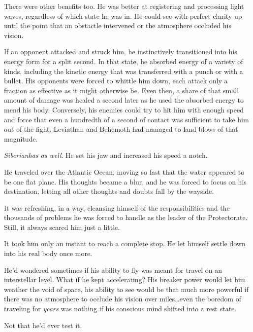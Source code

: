 There were other benefits too.  He was better at registering and processing light waves, regardless of which state he was in.  He could see with perfect clarity up until the point that an obstactle intervened or the atmosphere occluded his vision.



If an opponent attacked and struck him, he instinctively transitioned into his energy form for a split second.  In that state, he absorbed energy of a variety of kinds, including the kinetic energy that was transferred with a punch or with a bullet.  His opponents were forced to whittle him down, each attack only a fraction as effective as it might otherwise be.  Even then, a share of that small amount of damage was healed a second later as he used the absorbed energy to mend his body.  Conversely, his enemies could try to hit him with enough speed and force that even a hundredth of a second of contact was sufficient to take him out of the fight.  Leviathan and Behemoth had managed to land blows of that magnitude.



\emph{Siberian}\emph{has as well}.  He set his jaw and increased his speed a notch.



He traveled over the Atlantic Ocean, moving so fast that the water appeared to be one flat plane.  His thoughts became a blur, and he was forced to focus on his destination, letting all other thoughts and doubts fall by the wayside.



It was refreshing, in a way, cleansing himself of the responsibilities and the thousands of problems he was forced to handle as the leader of the Protectorate.  Still, it always scared him just a little.



It took him only an instant to reach a complete stop.  He let himself settle down into his real body once more.



He'd wondered sometimes if his ability to fly was meant for travel on an interstellar level.  What if he kept accelerating?  His breaker power would let him weather the void of space, his ability to see would be that much more powerful if there was no atmosphere to occlude his vision over miles\ldots even the boredom of traveling for \emph{years} was nothing if his conscious mind shifted into a rest state.



Not that he'd ever test it.



